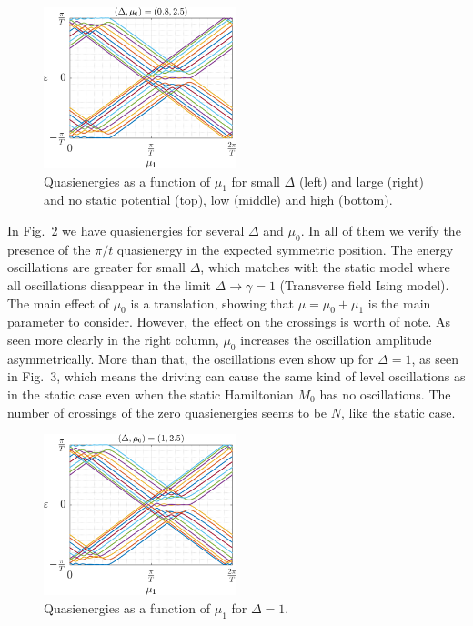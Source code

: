 \documentclass[11pt]{report}
\begin{document}
\begin{figure}
\includegraphics[width=0.5\textwidth]{Figures/Fig8.png}%
\caption{Quasienergies as a function of $\mu_1$ for small $\Delta$ (left) and large (right) and no static potential (top), low (middle) and high (bottom).}
\label{Fig:2}
\end{figure}

In Fig.~2 we have quasienergies for several $\Delta$ and $\mu_0$. In all of them we verify the presence of the $\pi/t$ quasienergy in the expected symmetric position. The energy oscillations are greater for small $\Delta$, which matches with the static model where all oscillations disappear in the limit $\Delta \rightarrow \gamma = 1$ (Transverse field Ising model). The main effect of $\mu_0$ is a translation, showing that $\mu = \mu_0 + \mu_1$ is the main parameter to consider. However, the effect on the crossings is worth of note. As seen more clearly in the right column, $\mu_0$ increases the oscillation amplitude asymmetrically. More than that, the oscillations even show up for $\Delta = 1$, as seen in Fig.~3, which means the driving can cause the same kind of level oscillations as in the static case even when the static Hamiltonian $M_0$ has no oscillations. The number of crossings of the zero quasienergies seems to be $N$, like the static case.

\begin{figure}
\centering
\includegraphics[width=0.5\textwidth]{Figures/Fig9.png}
\caption{Quasienergies as a function of $\mu_1$ for $\Delta = 1$.}
\label{Fig:3}
\end{figure}
\end{document}
